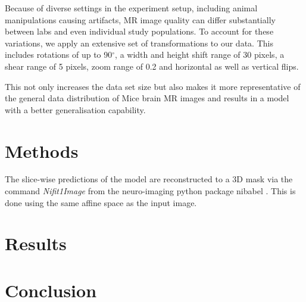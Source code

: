 \documentclass{article}
\begin{document}
Because of diverse settings in the experiment setup, including animal manipulations causing artifacts, MR image quality can differ substantially between labs and even individual study populations.
To account for these variations, we apply an extensive set of transformations to our data.
This includes rotations of up to 90$^{\circ}$, a width and height shift range of 30 pixels, a shear range of 5 pixels, zoom range of 0.2 and horizontal as well as vertical flips.

This not only increases the data set size but also makes it more representative of the general data distribution of Mice brain MR images and results in a model with a better generalisation capability.

\section{Methods}
The slice-wise predictions of the model are reconstructed to a 3D mask via the command \textit{Nifit1Image} from the neuro-imaging python package nibabel \cite{noauthor_neuroimaging_nodate}.
This is done using the same affine space as the input image.









\section{Results}

\section{Conclusion}




\end{document}
